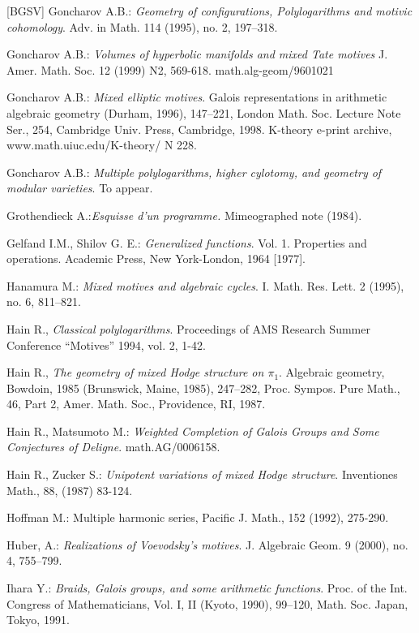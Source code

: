 \documentclass[10pt]{article}
\begin{document}
\begin{thebibliography}{[BGSV]}
 Goncharov A.B.: {\it Geometry of configurations, Polylogarithms and motivic cohomology}.  Adv. in Math.  114 (1995), no. 2, 197--318.

 Goncharov A.B.: {\it Volumes of hyperbolic manifolds and mixed Tate motives} J. Amer. Math. Soc. 12 (1999) N2, 569-618. math.alg-geom/9601021

 Goncharov A.B.: {\it Mixed elliptic motives}. Galois representations in arithmetic algebraic geometry (Durham, 1996), 147--221, London
Math. Soc. Lecture Note Ser., 254, Cambridge Univ. Press, Cambridge, 1998. 
K-theory e-print archive, www.math.uiuc.edu/K-theory/ N 228.

 Goncharov A.B.: {\it Multiple polylogarithms, higher
cylotomy, and geometry of modular varieties}. To appear. 

 Grothendieck A.:{\it Esquisse d'un programme.} 
Mimeographed note (1984).

 Gelfand I.M., Shilov G. E.: {\it Generalized functions}. Vol. 1. Properties and operations. 
Academic Press, New York-London, 1964 [1977].

 Hanamura M.: {\it Mixed motives and algebraic cycles}. I. 
Math. Res. Lett. 2 (1995), no. 6, 811--821. 

 Hain R., {\it Classical polylogarithms}. Proceedings of AMS Research Summer Conference ``Motives'' 1994, vol. 2, 1-42.

 Hain R., 
{\it The geometry of mixed Hodge structure on $\pi_1$}.  
 Algebraic geometry, Bowdoin, 1985
(Brunswick, Maine, 1985), 247--282, Proc. Sympos. Pure Math., 46, Part 2, Amer. Math. Soc., Providence, RI, 1987. 

 Hain R., Matsumoto M.: {\it Weighted Completion of Galois Groups and Some Conjectures of Deligne}. math.AG/0006158. 

 Hain R., Zucker S.: {\it Unipotent variations of mixed Hodge structure}. Inventiones Math., 88, (1987) 83-124. 

 Hoffman M.: Multiple harmonic series, Pacific J. Math., 
152 (1992), 275-290.

 Huber, A.: {\it Realizations of Voevodsky's motives}. J. Algebraic Geom. 9 (2000), no. 4, 755--799. 

 Ihara Y.: {\it Braids, Galois groups, and some arithmetic functions}. 
Proc. of the Int. Congress of Mathematicians, Vol. I, II
(Kyoto, 1990), 99--120, Math. Soc. Japan, Tokyo, 1991.


\end{thebibliography}
\end{document}
